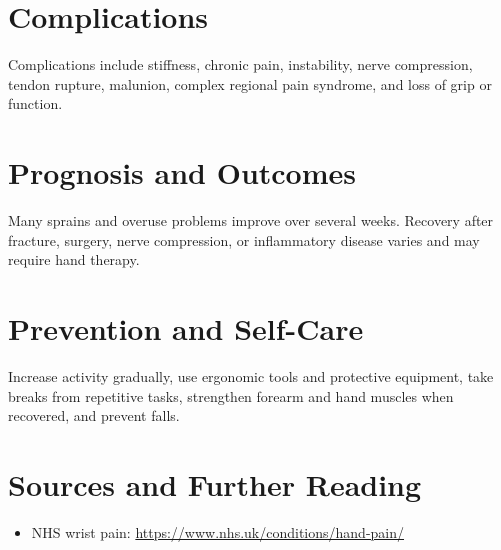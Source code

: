 \section*{Complications}
Complications include stiffness, chronic pain, instability, nerve compression, tendon rupture, malunion, complex regional pain syndrome, and loss of grip or function.
\section*{Prognosis and Outcomes}
Many sprains and overuse problems improve over several weeks. Recovery after fracture, surgery, nerve compression, or inflammatory disease varies and may require hand therapy.
\section*{Prevention and Self-Care}
Increase activity gradually, use ergonomic tools and protective equipment, take breaks from repetitive tasks, strengthen forearm and hand muscles when recovered, and prevent falls.
\section*{Sources and Further Reading}
\begin{itemize}
    \item NHS wrist pain: \url{https://www.nhs.uk/conditions/hand-pain/}
\end{itemize}
